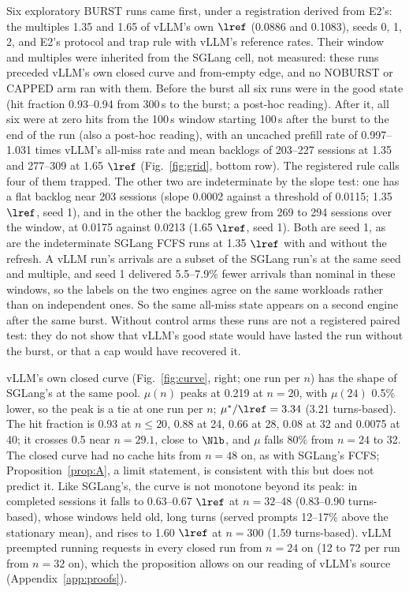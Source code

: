 Six exploratory BURST runs came first, under a registration derived from E2's: the multiples 1.35 and 1.65 of vLLM's own $\lref$ (0.0886 and 0.1083\sps), seeds 0, 1, 2, and E2's protocol and trap rule with vLLM's reference rates. Their window and multiples were inherited from the SGLang cell, not measured: these runs preceded vLLM's own closed curve and from-empty edge, and no NOBURST or CAPPED arm ran with them. Before the burst all six runs were in the good state (hit fraction 0.93--0.94 from 300\,s to the burst; a post-hoc reading). After it, all six were at zero hits from the 100\,s window starting 100\,s after the burst to the end of the run (also a post-hoc reading), with an uncached prefill rate of 0.997--1.031 times vLLM's all-miss rate and mean backlogs of 203--227 sessions at 1.35 and 277--309 at 1.65 $\lref$ (Fig.~\ref{fig:grid}, bottom row). The registered rule calls four of them trapped. The other two are indeterminate by the slope test: one has a flat backlog near 203 sessions (slope 0.0002 against a threshold of 0.0115; 1.35 $\lref$, seed 1), and in the other the backlog grew from 269 to 294 sessions over the window, at 0.0175 against 0.0213 (1.65 $\lref$, seed 1). Both are seed 1, as are the indeterminate SGLang FCFS runs at 1.35 $\lref$ with and without the refresh. A vLLM run's arrivals are a subset of the SGLang run's at the same seed and multiple, and seed 1 delivered 5.5--7.9\% fewer arrivals than nominal in these windows, so the labels on the two engines agree on the same workloads rather than on independent ones. So the same all-miss state appears on a second engine after the same burst. Without control arms these runs are not a registered paired test: they do not show that vLLM's good state would have lasted the run without the burst, or that a cap would have recovered it.

vLLM's own closed curve (Fig.~\ref{fig:curve}, right; one run per $n$) has the shape of SGLang's at the same pool. $\mu(n)$ peaks at 0.219\sps{} at $n=20$, with $\mu(24)$ 0.5\% lower, so the peak is a tie at one run per $n$; $\mu^*/\lref=3.34$ (3.21 turns-based). The hit fraction is 0.93 at $n\le20$, 0.88 at 24, 0.66 at 28, 0.08 at 32 and 0.0075 at 40; it crosses 0.5 near $n=29.1$, close to $\Nlb$, and $\mu$ falls 80\% from $n=24$ to 32. The closed curve had no cache hits from $n=48$ on, as with SGLang's FCFS; Proposition~\ref{prop:A}, a limit statement, is consistent with this but does not predict it. Like SGLang's, the curve is not monotone beyond its peak: in completed sessions it falls to 0.63--0.67 $\lref$ at $n=32$--48 (0.83--0.90 turns-based), whose windows held old, long turns (served prompts 12--17\% above the stationary mean), and rises to 1.60 $\lref$ at $n=300$ (1.59 turns-based). vLLM preempted running requests in every closed run from $n=24$ on (12 to 72 per run from $n=32$ on), which the proposition allows on our reading of vLLM's source (Appendix~\ref{app:proofs}).

